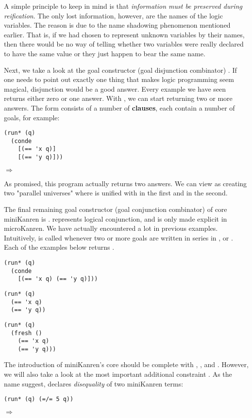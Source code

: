 A simple principle to keep in mind is that \textit{information must be preserved during reification}. The only lost information, however, are the names of the logic variables. The reason is due to the name shadowing phenomenon mentioned earlier. That is, if we had chosen to represent unknown variables by their names, then there would be no way of telling whether two variables were really declared to have the same value or they just happen to bear the same name.

Next, we take a look at the goal constructor (goal disjunction combinator) .
If one needs to point out exactly one thing that makes logic programming seem magical, disjunction would be a good answer. Every example we have seen returns either zero or one answer. With , we can start returning two or more answers. The  form consists of a number of \textbf{clauses}, each contain a number of goals, for example:

\begin{lstlisting}
(run* (q)
  (conde
    [(== 'x q)]
    [(== 'y q)]))
\end{lstlisting}
$\Rightarrow$ 

As promised, this program actually returns two answers. We can view  as creating two "parallel universes" where  is unified with  in the first and  in the second.

The final remaining goal constructor (goal conjunction combinator) of core miniKanren is .  represents logical conjunction, and is only made explicit in microKanren. We have actually encountered  a lot in previous examples. Intuitively,  is called whenever two or more goals are written in series in ,  or . Each of the examples below returns \code{()}.
\begin{lstlisting}
(run* (q)
  (conde
    [(== 'x q) (== 'y q)]))
\end{lstlisting}

\begin{lstlisting}
(run* (q)
  (== 'x q)
  (== 'y q))
\end{lstlisting}

\begin{lstlisting}
(run* (q)
  (fresh ()
    (== 'x q)
    (== 'y q)))
\end{lstlisting}

The introduction of miniKanren's core should be complete with \code{==}, ,  and . However, we will also take a look at the most important additional constraint \code{=/=}. As the name suggest, \code{=/=} declares \textit{disequality} of two miniKanren terms:
\begin{lstlisting}
(run* (q) (=/= 5 q))
\end{lstlisting}
$\Rightarrow$ 

